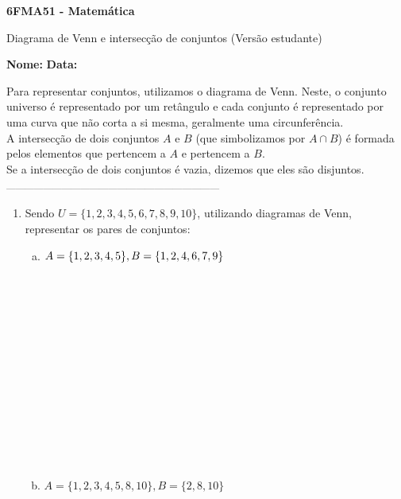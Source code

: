 \documentclass[a4paper,14pt]{article}
\begin{document}
	
	\noindent\textbf{6FMA51 - Matemática} 
	
	\begin{center}Diagrama de Venn e intersecção de conjuntos (Versão estudante)
	\end{center}
	
	\noindent\textbf{Nome:} \underline{\hspace{10cm}}
	\noindent\textbf{Data:} \underline{\hspace{4cm}}
	
	\begin{multicols}{2}
    		\noindent Para representar conjuntos, utilizamos o diagrama de Venn. Neste, o conjunto universo é representado por um retângulo e cada conjunto é representado por uma curva que não corta a si mesma, geralmente uma circunferência. \\
    		A intersecção de dois conjuntos $A$ e $B$ (que simbolizamos por $A \cap B$) é formada pelos elementos que pertencem a $A$ e pertencem a $B$. \\
    		Se a intersecção de dois conjuntos é vazia, dizemos que eles são disjuntos.
    		\textsubscript{---------------------------------------------------------------------}
    		\begin{enumerate}
    			\item Sendo $U = \{1, 2, 3, 4, 5, 6, 7, 8, 9, 10\}$, utilizando diagramas de Venn, representar os pares de conjuntos:
    			\begin{enumerate}[a)]
    				\item $A = \{1, 2, 3, 4, 5\}, \\ B = \{1, 2, 4, 6, 7, 9\}$ \\\\\\\\\\\\\\\\\\\\\\\\\\\\
    				\item $A = \{1, 2, 3, 4, 5, 8, 10\}, B = \{2, 8, 10\}$ \\\\\\\\\\\\\\\\\\\\\\

\end{enumerate}
\end{enumerate}
\end{multicols}
\end{document}
